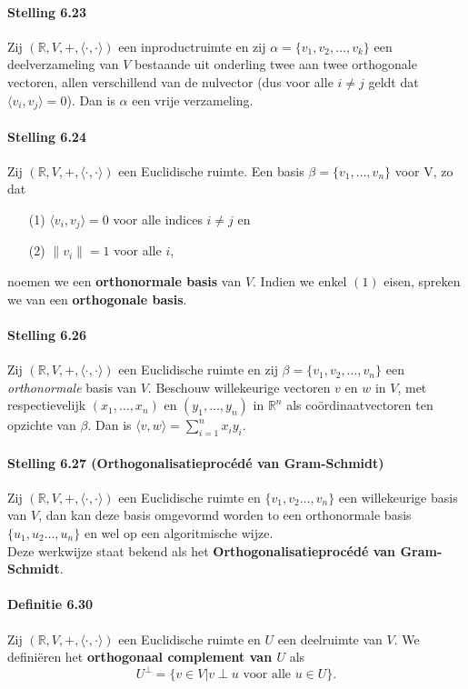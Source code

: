 \documentclass[11pt,oneside,a4paper]{article}
\begin{document}
	\paragraph{Stelling 6.23}
		Zij $(\mathbb{R},V,+, \langle \cdot , \cdot \rangle)$ een inproductruimte en zij $\alpha = \{v_1, v_2, \ldots ,v_k\}$ een deelverzameling van $V$ bestaande uit onderling twee aan twee orthogonale vectoren, allen verschillend van de nulvector (dus voor alle $i \ne j$ geldt dat $\langle v_i , v_j \rangle = 0$). Dan is $\alpha$ een vrije verzameling.
	\paragraph{Stelling 6.24}	
		Zij $(\mathbb{R},V,+, \langle \cdot , \cdot \rangle)$ een Euclidische ruimte. Een basis $\beta = \{v_1, \ldots, v_n\}$ voor V, zo dat
		\begin{itemize}
			\item[(1)] $\langle v_i , v_j \rangle = 0$ voor alle indices $i \ne j$ en
			\item[(2)] $\lVert v_i \rVert = 1$ voor alle $i$,
		\end{itemize} 
		noemen we een \textbf{orthonormale basis} van $V$. Indien we enkel $(1)$ eisen, spreken we van een \textbf{orthogonale basis}.
	\paragraph{Stelling 6.26}
		Zij $(\mathbb{R},V,+, \langle \cdot , \cdot \rangle)$ een Euclidische ruimte en zij $\beta = \{v_1, v_2, \ldots, v_n\}$ een \textit{orthonormale} basis van $V$. Beschouw willekeurige vectoren $v$ en $w$ in $V$, met respectievelijk $(x_1, \ldots, x_n)$ en $(y_1, \ldots, y_n)$ in $\mathbb{R}^n$ als coördinaatvectoren ten opzichte van $\beta$. Dan is $\langle v , w \rangle = \sum_{i=1}^{n} x_i y_i$.
	\paragraph{Stelling 6.27 (Orthogonalisatieprocédé van Gram-Schmidt)}	
		Zij $(\mathbb{R},V,+, \langle \cdot , \cdot \rangle)$ een Euclidische ruimte en $\{v_1, v_2 \ldots, v_n\}$	 een willekeurige basis van $V$, dan kan deze basis omgevormd worden to een orthonormale basis $\{u_1, u_2 \ldots, u_n\}$ en wel op een algoritmische wijze. \\ Deze werkwijze staat bekend als het \textbf{Orthogonalisatieprocédé van Gram-Schmidt}.
	\paragraph{Definitie 6.30}
		Zij $(\mathbb{R},V,+, \langle \cdot , \cdot \rangle)$ een Euclidische ruimte en $U$ een deelruimte van $V$. We definiëren het \textbf{orthogonaal complement van $U$} als $$U^\perp = \{v\in V \lvert v \perp u \text{ voor alle } u \in U\}.$$
\end{document}

